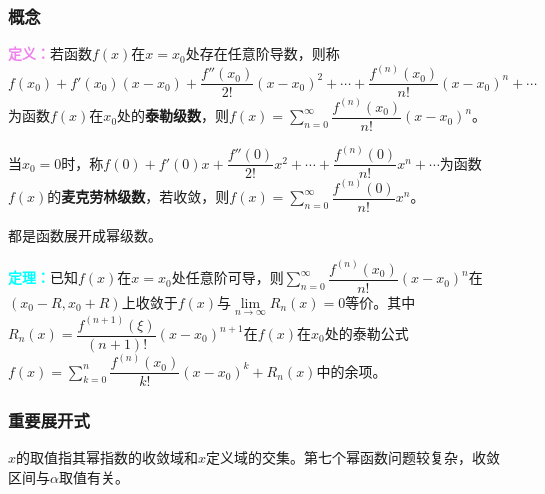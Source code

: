 \documentclass[UTF8, 12pt]{ctexart}
\begin{document}
        \subsubsection{概念}

        \textcolor{violet}{\textbf{定义：}}若函数$f(x)$在$x=x_0$处存在任意阶导数，则称$f(x_0)+f'(x_0)(x-x_0)+\dfrac{f''(x_0)}{2!}(x-x_0)^2+\cdots+\dfrac{f^{(n)}(x_0)}{n!}(x-x_0)^n+\cdots$为函数$f(x)$在$x_0$处的\textbf{泰勒级数}，则$f(x)=\sum\limits_{n=0}^\infty\dfrac{f^{(n)}(x_0)}{n!}(x-x_0)^n$。

        当$x_0=0$时，称$f(0)+f'(0)x+\dfrac{f''(0)}{2!}x^2+\cdots+\dfrac{f^{(n)}(0)}{n!}x^n+\cdots$为函数$f(x)$的\textbf{麦克劳林级数}，若收敛，则$f(x)=\sum\limits_{n=0}^\infty\dfrac{f^{(n)}(0)}{n!}x^n$。

        都是函数展开成幂级数。

        \textcolor{aqua}{\textbf{定理：}}已知$f(x)$在$x=x_0$处任意阶可导，则$\sum\limits_{n=0}^\infty\dfrac{f^{(n)}(x_0)}{n!}(x-x_0)^n$在$(x_0-R,x_0+R)$上收敛于$f(x)$与$\lim\limits_{n\to\infty}R_n(x)=0$等价。其中$R_n(x)=\dfrac{f^{(n+1)}(\xi)}{(n+1)!}(x-x_0)^{n+1}$在$f(x)$在$x_0$处的泰勒公式$f(x)=\sum\limits_{k=0}^n\dfrac{f^{(n)}(x_0)}{k!}(x-x_0)^k+R_n(x)$中的余项。

        \subsubsection{重要展开式}

        $x$的取值指其幂指数的收敛域和$x$定义域的交集。第七个幂函数问题较复杂，收敛区间与$\alpha$取值有关。
\end{document}
